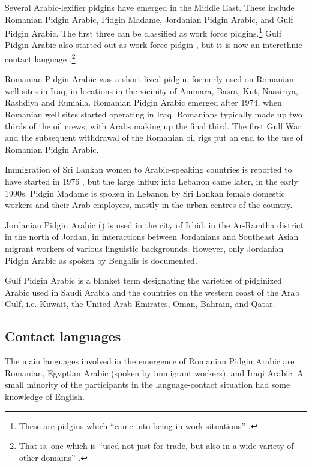 \documentclass[output=paper]{langsci/langscibook}
\begin{document}
Several Arabic-lexifier pidgins have emerged in the Middle East. These include Romanian Pidgin Arabic, Pidgin Madame, Jordanian Pidgin Arabic, and Gulf Pidgin Arabic. The first three can be classified as work force pidgins.\footnote{These are pidgins which “came into being in work situations” \citep[28]{Bakker1995}.} Gulf Pidgin Arabic also started out as work force pidgin \citep[83]{Smart1990}, but it is now an interethnic contact language \citep[13]{Avram2014Pidgin}.\footnote{That is, one which is “used not just for trade, but also in a wide variety of other domains” \citep[28]{Bakker1995}.}

Romanian Pidgin Arabic \citep{Avram2010} was a short-lived pidgin, formerly used on Romanian well sites in Iraq, in locations in the vicinity of Ammara, Basra, Kut, Nassiriya, Rashdiya and Rumaila. Romanian Pidgin Arabic emerged after 1974, when Romanian well sites started operating in Iraq. Romanians typically made up two thirds of the oil crews, with Arabs making up the final third. The first Gulf War and the subsequent withdrawal of the Romanian oil rigs put an end to the use of Romanian Pidgin Arabic. 

Immigration of Sri Lankan women to Arabic-speaking countries is reported to have started in 1976 \citep[16]{Bizri2010}, but the large influx into Lebanon came later, in the early 1990s. Pidgin Madame is spoken in Lebanon by Sri Lankan female domestic workers and their Arab employers, mostly in the urban centres of the country. 

  Jordanian Pidgin Arabic (\citealt{Al-Salman2013}) is used in the city of Irbid, in the Ar-Ramtha district in the north of Jordan, in interactions between Jordanians and Southeast Asian migrant workers of various linguistic backgrounds. However, only Jordanian Pidgin Arabic as spoken by Bengalis is documented.  

Gulf Pidgin Arabic is a blanket term designating the varieties of pidginized Arabic used in Saudi Arabia and the countries on the western coast of the Arab Gulf, i.e. Kuwait, the United Arab Emirates, Oman, Bahrain, and Qatar. 


 
 \subsection{Contact languages}


The main languages involved in the emergence of Romanian Pidgin Arabic are Romanian, Egyptian Arabic (spoken by immigrant workers), and Iraqi Arabic. A small minority of the participants in the language-contact situation had some knowledge of English.
\end{document}
